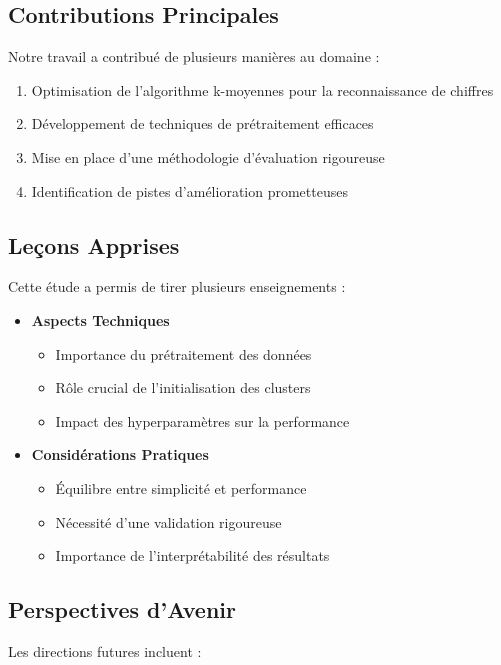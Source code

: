 \subsection{Contributions Principales}
Notre travail a contribué de plusieurs manières au domaine :

\begin{enumerate}
    \item Optimisation de l'algorithme k-moyennes pour la reconnaissance de chiffres
    \item Développement de techniques de prétraitement efficaces
    \item Mise en place d'une méthodologie d'évaluation rigoureuse
    \item Identification de pistes d'amélioration prometteuses
\end{enumerate}

\subsection{Leçons Apprises}
Cette étude a permis de tirer plusieurs enseignements :

\begin{itemize}
    \item \textbf{Aspects Techniques}
    \begin{itemize}
        \item Importance du prétraitement des données
        \item Rôle crucial de l'initialisation des clusters
        \item Impact des hyperparamètres sur la performance
    \end{itemize}

    \item \textbf{Considérations Pratiques}
    \begin{itemize}
        \item Équilibre entre simplicité et performance
        \item Nécessité d'une validation rigoureuse
        \item Importance de l'interprétabilité des résultats
    \end{itemize}
\end{itemize}

\subsection{Perspectives d'Avenir}
Les directions futures incluent :

